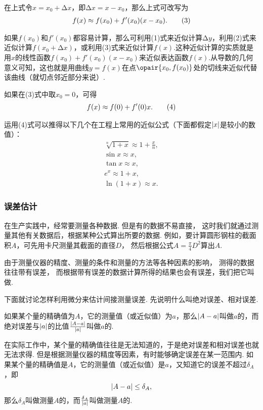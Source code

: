 在上式令\(x = x_0 + \increment x\)，即\(\increment x = x - x_0\)，那么上式可改写为\begin{gather}
f(x) \approx f(x_0) + f'(x_0) (x - x_0). \tag3
\end{gather}

如果\(f(x_0)\)和\(f'(x_0)\)都容易计算，那么可利用(1)式来近似计算\(\increment y\)，利用(2)式来近似计算\(f(x_0 + \increment x)\)，或利用(3)式来近似计算\(f(x)\).这种近似计算的实质就是用\(x\)的线性函数\(f(x_0) + f'(x_0) (x - x_0)\)来近似表达函数\(f(x)\).从导数的几何意义可知，这也就是用曲线\(y=f(x)\)在点\(\opair{x_0,f(x_0)}\)处的切线来近似代替该曲线（就切点邻近部分来说）.

如果在(3)式中取\(x_0 = 0\)，可得\begin{gather}
f(x) \approx f(0) + f'(0) x. \tag4
\end{gather}

运用(4)式可以推得以下几个在工程上常用的近似公式（下面都假定\(\abs{x}\)是较小的数值）：
\begin{gather}
	\sqrt[n]{1+x} \approx 1 + \frac{x}{n}, \\
	\sin x \approx x, \\
	\tan x \approx x, \\
	e^x \approx 1 + x, \\
	\ln(1+x) \approx x.
\end{gather}

\subsubsection{误差估计}
在生产实践中，经常要测量各种数据.
但是有的数据不易直接，
这时我们就通过测量其他有关数据后，根据某种公式算出所要的数据.
例如，要计算圆形钢柱的截面积\(A\)，可先用卡尺测量其截面的直径\(D\)，
然后根据公式\(A = \frac{\pi}{4} D^2\)算出\(A\).

由于测量仪器的精度、测量的条件和测量的方法等各种因素的影响，
测得的数据往往带有误差，
而根据带有误差的数据计算所得的结果也会有误差，我们把它叫做.

下面就讨论怎样利用微分来估计间接测量误差.
先说明什么叫绝对误差、相对误差.

如果某个量的精确值为\(A\)，它的测量值（或近似值）为\(a\)，那么\(\abs{A-a}\)叫做\(a\)的，而绝对误差与\(\abs{a}\)的比值\(\frac{\abs{A-a}}{\abs{a}}\)叫做\(a\)的.

在实际工作中，某个量的精确值往往是无法知道的，于是绝对误差和相对误差也就无法求得.
但是根据测量仪器的精度等因素，有时能够确定误差在某一范围内.
如果某个量的精确值是\(A\)，它的测量值（或近似值）是\(a\)，又知道它的误差不超过\(\delta_A\)，即\begin{equation*}
\abs{A-a} \leq \delta_A,
\end{equation*}那么\(\delta_A\)叫做测量\(A\)的，而\(\frac{\delta_A}{\abs{a}}\)叫做测量\(A\)的.

